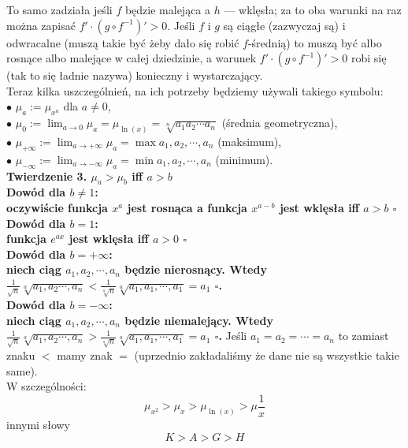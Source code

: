 \documentclass{article}
\begin{document}
To samo zadziała jeśli $f$ będzie malejąca a $h$ --- wklęsła; za to oba warunki na raz można zapisać $f'\cdot(g\circ f^{-1})'>0$.
Jeśli $f$ i $g$ są ciągłe (zazwyczaj są) i odwracalne (muszą takie być żeby dało się robić $f$-średnią) to muszą być albo rosnące albo malejące w całej dziedzinie, a warunek $f'\cdot(g\circ f^{-1})'>0$ robi się (tak to się ładnie nazywa) konieczny i wystarczający.
\\Teraz kilka uszczególnień, na ich potrzeby będziemy używali takiego symbolu:
\\$\bullet$ $\mu_a:=\mu_{x^a}$ dla $a\neq 0$,
\\$\bullet$ $\mu_0:=\lim_{a\to0}\mu_a=\mu_{\ln(x)}=\sqrt[n]{a_1a_2\cdots a_n}$ (średnia geometryczna),
\\$\bullet$ $\mu_{+\infty}:=\lim_{a\to+\infty}\mu_a=\max{a_1, a_2, \cdots, a_n}$ (maksimum),
\\$\bullet$ $\mu_{-\infty}:=\lim_{a\to-\infty}\mu_a=\min{a_1, a_2, \cdots, a_n}$ (minimum).
\\\textbf{Twierdzenie 3. $\mu_a>\mu_b$ iff $a>b$
\\Dowód dla $b\neq 1$:
\\oczywiście funkcja $x^a$ jest rosnąca a funkcja $x^{a-b}$ jest wklęsła iff $a>b$ $\square$
\\Dowód dla $b=1$:
\\funkcja $e^{ax}$ jest wklęsła iff $a>0$ $\square$
\\Dowód dla $b=+\infty$:
\\niech ciąg $a_1, a_2, \cdots, a_n$ będzie nierosnący. Wtedy $\frac1{\sqrt{n}}\sqrt[a]{a_1, a_2\cdots, a_n} < \frac1{\sqrt[a]{n}}\sqrt[a]{a_1, a_1, \cdots, a_1} = a_1$ $\square$.
\\Dowód dla $b=-\infty$:
\\niech ciąg $a_1, a_2, \cdots, a_n$ będzie niemalejący. Wtedy $\frac1{\sqrt{n}}\sqrt[a]{a_1, a_2\cdots, a_n} > \frac1{\sqrt[a]{n}}\sqrt[a]{a_1, a_1, \cdots, a_1} = a_1$ $\square$.
}
Jeśli $a_1=a_2=\cdots=a_n$ to zamiast znaku $<$ mamy znak $=$ (uprzednio zakładaliśmy że dane nie są wszystkie takie same).
\\W szczególności:\[
	\mu_{x^2}>\mu_x>\mu_{\ln(x)}>\mu{\frac1x}
\]
innymi słowy\[K>A>G>H\]
\end{document}
